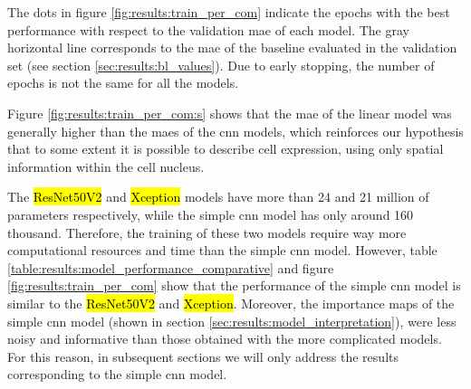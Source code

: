 The dots in figure \ref{fig:results:train_per_com} indicate the epochs with the best performance with respect to the validation \gls{mae} of each model.
The gray horizontal line corresponds to the \gls{mae} of the baseline evaluated in the validation set (see section \ref{sec:results:bl_values}). Due to early stopping, the number of epochs is not the same for all the models.

Figure \ref{fig:results:train_per_com:s} shows that the \gls{mae} of the linear model was generally higher than the \glspl{mae} of the \gls{cnn} models, which reinforces our hypothesis that to some extent it is possible to describe cell expression, using only spatial information within the cell nucleus.

The \hl{ResNet50V2} and \hl{Xception} models have more than 24 and 21 million of parameters respectively, while the simple \gls{cnn} model has only around 160 thousand. Therefore, the training of these two models require way more computational resources and time than the simple \gls{cnn} model.
However, table \ref{table:results:model_performance_comparative} and figure \ref{fig:results:train_per_com} show that the performance of the simple \gls{cnn} model is similar to the \hl{ResNet50V2} and \hl{Xception}.
Moreover, the importance maps of the simple \gls{cnn} model (shown in section \ref{sec:results:model_interpretation}), were less noisy and informative than those obtained with the more complicated models. For this reason, in subsequent sections we will only address the results corresponding to the simple \gls{cnn} model.
